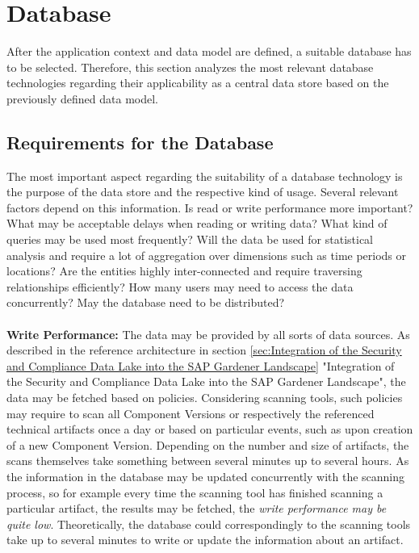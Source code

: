 \section{Database}
After the application context and data model are defined, a suitable database has to be selected. Therefore, this section analyzes the most relevant database technologies regarding their applicability as a central data store based on the previously defined data model.

\subsection{Requirements for the Database}
The most important aspect regarding the suitability of a database technology is the purpose of the data store and the respective kind of usage. Several relevant factors depend on this information. Is read or write performance more important? What may be acceptable delays when reading or writing data? What kind of queries may be used most frequently? Will the data be used for statistical analysis and require a lot of aggregation over dimensions such as time periods or locations? Are the entities highly inter-connected and require traversing relationships efficiently? How many users may need to access the data concurrently? May the database need to be distributed?\\\\
\textbf{Write Performance:} The data may be provided by all sorts of data sources. As described in the reference architecture in section \ref{sec:Integration of the Security and Compliance Data Lake into the SAP Gardener Landscape} "Integration of the Security and Compliance Data Lake into the SAP Gardener Landscape", %
the data may be fetched based on policies. Considering scanning tools, such policies may require to scan all Component Versions or respectively the referenced technical artifacts once a day or based on particular events, such as upon creation of a new Component Version. Depending on the number and size of artifacts, the scans themselves take something between several minutes up to several hours. As the information in the database may be updated concurrently with the scanning process, so for example every time the scanning tool has finished scanning a particular artifact, the results may be fetched, the \emph{write performance may be quite low}. Theoretically, the database could correspondingly to the scanning tools take up to several minutes to write or update the information about an artifact.\\
